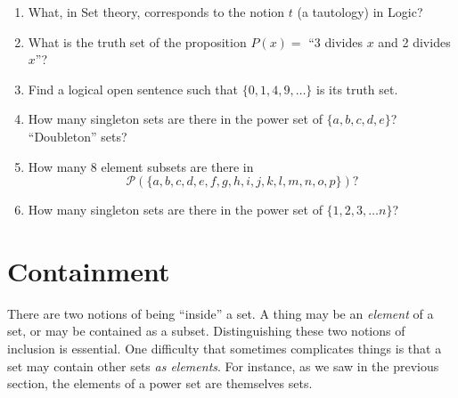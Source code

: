 \documentclass[10pt,]{book}
\theoremstyle{plain}
\theoremstyle{definition}
\theoremstyle{definition}
\numberwithin{equation}{section}
\newcommand{\hint}[1]{ }
\newcommand{\Integers}{{\mathbb Z}}
\begin{document}
\begin{enumerate}[label=(\alph*)]
        \hint{A contradiction.}
\item\hypertarget{li-299}{}
        What, in Set theory, corresponds to the notion \(t\) (a tautology) in Logic?

        \hint{The universe of discourse.}
\item\hypertarget{li-300}{}
        What is the truth set of the proposition \(P(x) =\) ``3 divides \(x\) and 2 divides \(x\)''?

        \hint{ The set of all multiples of \(6\).}
\item\hypertarget{li-301}{}
        Find a logical open sentence such that \(\{0, 1, 4, 9, \ldots \}\) is
        its truth set.

        \hint{Many answers are possible.  Perhaps the easiest is \(\exists y \in \Integers, x = y^2\).}
\item\hypertarget{li-302}{}
        How many singleton sets are there in the power set of 
        \(\{a,b,c,d,e\}\)?  ``Doubleton'' sets?

        \hint{5, 10}
\item\hypertarget{li-303}{}
        How many 8 element subsets are there in
        \begin{equation*}
          {\mathcal P}(\{a,b,c,d,e,f,g,h,i,j,k,l,m,n,o,p\})?
        \end{equation*}
        \hint{ \(\binom{16}{8} = 12870\)}
\item\hypertarget{li-304}{}
        How many singleton sets are there in the power set of 
        \(\{1,2,3, \ldots n\}\)?

        \hint{\(n\)}
\end{enumerate}
\typeout{************************************************}
\typeout{************************************************}
\section[{Containment}]{Containment}\label{section-22}

    There are two notions of being ``inside'' a set. A thing may be
    an \emph{element} of a set, or may be contained as
    a subset. Distinguishing these two notions of inclusion is essential.
    One difficulty that sometimes complicates things is that a set may contain
    other sets \emph{as elements}. For instance, as we saw in the previous
    section, the elements of a power set are themselves sets.
\par
\end{document}
